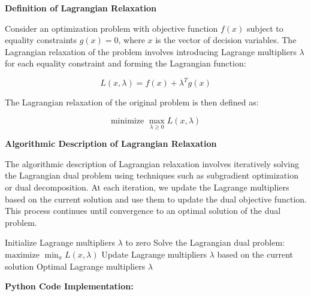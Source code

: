 \documentclass[12pt]{book} %
\begin{document}
\textbf{Definition of Lagrangian Relaxation}

Consider an optimization problem with objective function \(f(x)\) subject to equality constraints \(g(x) = 0\), where \(x\) is the vector of decision variables. The Lagrangian relaxation of the problem involves introducing Lagrange multipliers \(\lambda\) for each equality constraint and forming the Lagrangian function:

\[
L(x, \lambda) = f(x) + \lambda^T g(x)
\]

The Lagrangian relaxation of the original problem is then defined as:

\[
\text{minimize } \max_{\lambda \geq 0} L(x, \lambda)
\]

\textbf{Algorithmic Description of Lagrangian Relaxation}

The algorithmic description of Lagrangian relaxation involves iteratively solving the Lagrangian dual problem using techniques such as subgradient optimization or dual decomposition. At each iteration, we update the Lagrange multipliers based on the current solution and use them to update the dual objective function. This process continues until convergence to an optimal solution of the dual problem.
\FloatBarrier
\begin{algorithm}
\caption{Lagrangian Relaxation Algorithm}
\begin{algorithmic}[1]
    \State Initialize Lagrange multipliers $\lambda$ to zero
    \Repeat
        \State Solve the Lagrangian dual problem:
        \State \hspace{\algorithmicindent} $\text{maximize } \min_{x} L(x, \lambda)$
        \State Update Lagrange multipliers $\lambda$ based on the current solution
    \State \Return Optimal Lagrange multipliers $\lambda$
\EndFunction
\end{algorithmic}
\end{algorithm}
\FloatBarrier
\textbf{Python Code Implementation:}
\FloatBarrier
\end{document}
